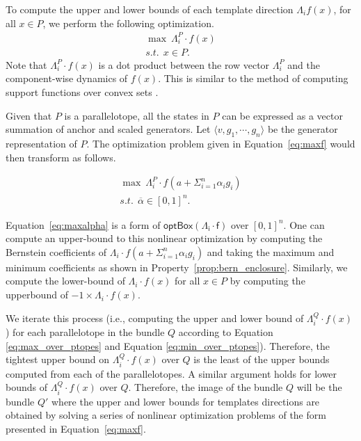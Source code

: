%
%
%
%
To compute the upper and lower bounds of each template direction $\Lambda_{i} f(x)$, for all $x \in P$, we perform the following optimization.
%
\begin{eqnarray}
  \max ~ \Lambda_i^{P} \cdot f(x) \label{eq:maxf}\\
  s.t. ~~ x \in P.\nonumber
\end{eqnarray}
%
\noindent Note that $\Lambda_i^{P} \cdot f(x)$ is a dot product between the row vector $\Lambda_i^{P}$ and the component-wise dynamics of $f(x)$. This is similar to the method of computing support functions over convex sets \cite{boyd2004convex}.


Given that $P$ is a parallelotope, all the states in $P$ can be expressed as a vector summation of anchor and scaled generators.
%
Let  $\langle v, g_1, \cdots, g_n \rangle$ be the generator representation of $P$.
%
The optimization problem given in Equation~\ref{eq:maxf} would then transform as follows.

\begin{eqnarray}
  \max ~ \Lambda_i^P \cdot f(a + \Sigma_{i=1}^{n} \alpha_i g_i) \label{eq:maxalpha}\\
  s.t. ~~ \overline\alpha \in [0,1]^{n}.\nonumber
\end{eqnarray}

Equation~\ref{eq:maxalpha} is a form of $\mathsf{optBox(\Lambda_{i} \cdot f)}$ over $[0,1]^n$.
%
One can compute an upper-bound to this nonlinear optimization by computing the Bernstein coefficients of $\Lambda_i \cdot f(a + \Sigma_{i=1}^{n} \alpha_i g_i)$ and taking the maximum and minimum coefficients as shown in Property~\ref{prop:bern_enclosure}.
%
Similarly, we compute the lower-bound of $\Lambda_{i}\cdot f(x)$ for all $x \in P$ by computing the upperbound of $-1 \times \Lambda_{i}\cdot f(x)$.
%

We iterate this process (i.e., computing the upper and lower bound of $\Lambda^Q_{i}\cdot f(x)$) for each parallelotope in the bundle $Q$ according to Equation \ref{eq:max_over_ptopes} and Equation \ref{eq:min_over_ptopes}).
%
%
Therefore, the tightest upper bound on $\Lambda^Q_{i}\cdot f(x)$ over $Q$ is the least of the upper bounds computed from each of the parallelotopes.
%
A similar argument holds for lower bounds of $\Lambda^Q_{i}\cdot f(x)$ over $Q$.
%
Therefore, the image of the bundle $Q$ will be the bundle $Q'$ where the upper and lower bounds for templates directions are obtained by solving a series of nonlinear optimization problems of the form presented in Equation~\ref{eq:maxf}.

